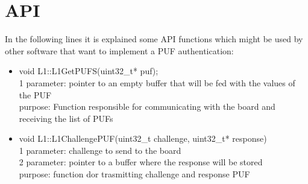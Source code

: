\chapter{API}
\label{api}

In the following lines it is explained some API functions which might be used by other software that want to implement a PUF authentication:
\begin{itemize}
	\item void L1::L1GetPUFS(uint32\_t* puf);
		\\
		1 parameter: pointer to an empty buffer that will be fed with the values of the PUF
		\\
		purpose: Function responsible for communicating with the board and receiving the list of PUFs
		
	\item void L1::L1ChallengePUF(uint32\_t challenge, uint32\_t* response)
		\\
		1 parameter: challenge to send to the board
		\\
		2 parameter: pointer to a buffer where the response will be stored	
		\\
		purpose: function dor trasmitting challenge and response PUF
\end{itemize}